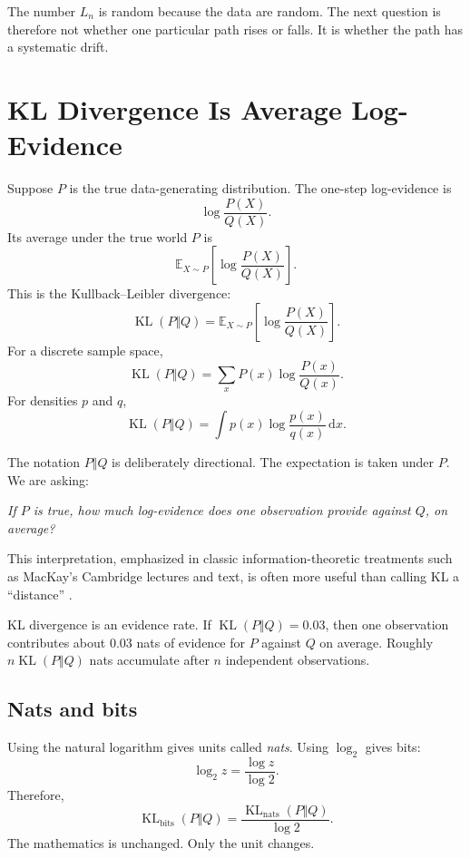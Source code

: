 \documentclass[en,nofont,11pt]{elegantbook}
\newcommand{\E}{\mathbb{E}}
\newcommand{\KL}{\operatorname{KL}}
\newcommand{\dd}{\mathrm{d}}
\begin{document}
The number $L_n$ is random because the data are random. The next question is therefore not whether one particular path rises or falls. It is whether the path has a systematic drift.

\chapter{KL Divergence Is Average Log-Evidence}

Suppose $P$ is the true data-generating distribution. The one-step log-evidence is
\[
\log\frac{P(X)}{Q(X)}.
\]
Its average under the true world $P$ is
\[
\E_{X\sim P}\left[\log\frac{P(X)}{Q(X)}\right].
\]
This is the Kullback--Leibler divergence:
\[
\boxed{
\KL(P\Vert Q)
=
\E_{X\sim P}\left[\log\frac{P(X)}{Q(X)}\right].
}
\]
For a discrete sample space,
\[
\KL(P\Vert Q)
=
\sum_x P(x)\log\frac{P(x)}{Q(x)}.
\]
For densities $p$ and $q$,
\[
\KL(P\Vert Q)
=
\int p(x)\log\frac{p(x)}{q(x)}\,\dd x.
\]

The notation $P\Vert Q$ is deliberately directional. The expectation is taken under $P$. We are asking:

\begin{center}
\emph{If $P$ is true, how much log-evidence does one observation provide against $Q$, on average?}
\end{center}

This interpretation, emphasized in classic information-theoretic treatments such as MacKay's Cambridge lectures and text, is often more useful than calling KL a ``distance'' \cite{mackay2003information,kullback1951information}.

\begin{keyidea}
KL divergence is an evidence rate. If $\KL(P\Vert Q)=0.03$, then one observation contributes about $0.03$ nats of evidence for $P$ against $Q$ on average. Roughly $n\KL(P\Vert Q)$ nats accumulate after $n$ independent observations.
\end{keyidea}

\section{Nats and bits}

Using the natural logarithm gives units called \emph{nats}. Using $\log_2$ gives bits:
\[
\log_2 z
=
\frac{\log z}{\log 2}.
\]
Therefore,
\[
\KL_{\mathrm{bits}}(P\Vert Q)
=
\frac{\KL_{\mathrm{nats}}(P\Vert Q)}{\log 2}.
\]
The mathematics is unchanged. Only the unit changes.
\end{document}
